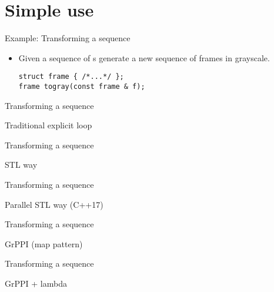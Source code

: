 \section{Simple use}

\begin{frame}[t,fragile]{Example: Transforming a sequence}
\begin{itemize}
  \item Given a sequence of s generate a new
        sequence of frames in grayscale.
\begin{lstlisting}
struct frame { /*...*/ };
frame togray(const frame & f);
\end{lstlisting}
\end{itemize}
\begin{center}

\end{center}
\end{frame}

\begin{frame}[t,fragile]{Transforming a sequence}
\begin{block}{Traditional explicit loop}

\end{block}
\end{frame}

\begin{frame}[t,fragile]{Transforming a sequence}
\begin{block}{STL way}

\end{block}
\end{frame}

\begin{frame}[t,fragile]{Transforming a sequence}
\begin{block}{Parallel STL way (C++17)}

\end{block}
\end{frame}

\begin{frame}[t,fragile]{Transforming a sequence}
\begin{block}{GrPPI (map pattern)}

\end{block}
\end{frame}

\begin{frame}[t,fragile]{Transforming a sequence}
\begin{block}{GrPPI + lambda}

\end{block}
\end{frame}

